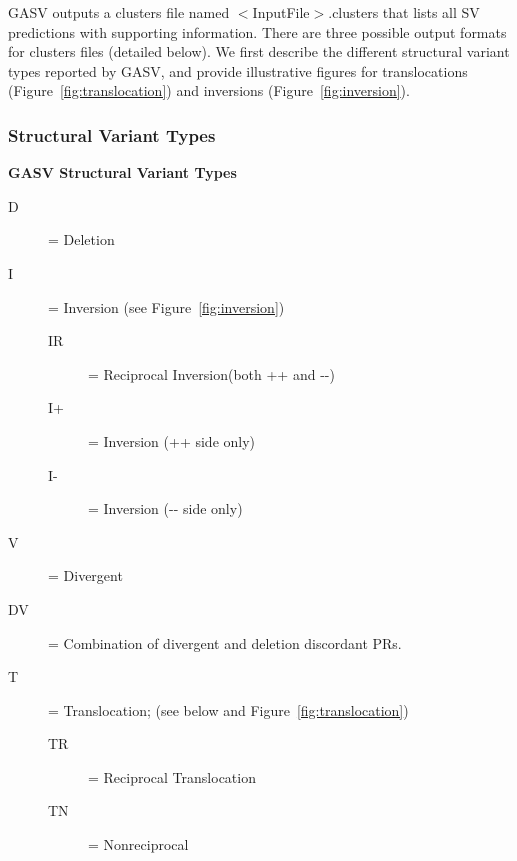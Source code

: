 \documentclass[11pt]{article}
\begin{document}
GASV outputs a clusters file named $<$InputFile$>$.clusters that lists all SV predictions with supporting information. There are three possible output formats for clusters files (detailed below).  We first describe the different structural variant types reported by GASV, and provide illustrative figures for translocations (Figure~\ref{fig:translocation}) and inversions (Figure~\ref{fig:inversion}).

\subsubsection{Structural Variant Types}
\label{sec:SVTypes}

\begin{framed}
\begin{center} \textbf{GASV Structural Variant Types} \end{center}
\begin{description}
\item[D] =     Deletion
\item[I] =    Inversion  (see Figure~\ref{fig:inversion})
\begin{description}
\item[IR] = Reciprocal Inversion(both ++ and -{}-)
\item[I+] =    Inversion (++ side only)
\item[I-] =    Inversion (-{}- side only)
\end{description}
\item[V] =    Divergent
\item[DV] = Combination of divergent and deletion discordant PRs.
\item[T] = Translocation; (see below and Figure~\ref{fig:translocation})
\begin{description}
\item[TR] = Reciprocal Translocation
\item[TN] = Nonreciprocal 
\end{description}
\end{description}
\end{framed}
\label{structvartypes}
\end{document}
